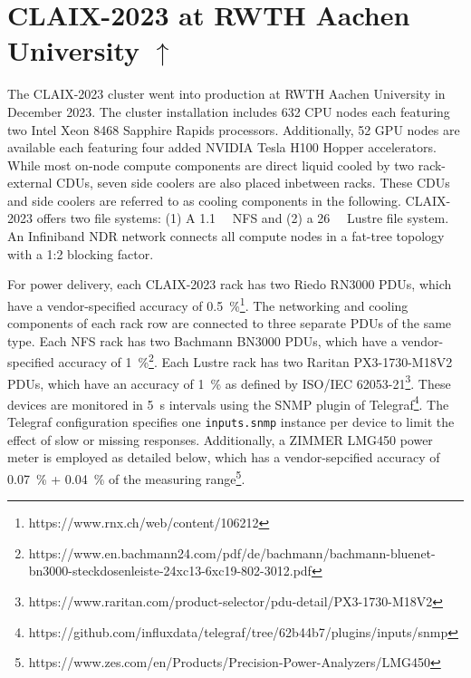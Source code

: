 \section[CLAIX-2023 at RWTH Aachen University]{CLAIX-2023 at RWTH Aachen University \hyperref[tab:examples-overview]{$\uparrow$}}
\label{sec:example-rwth-claix-2023}

The CLAIX-2023 cluster went into production at RWTH Aachen University in December 2023.
The cluster installation includes 632 CPU nodes each featuring two Intel Xeon 8468 Sapphire Rapids processors.
Additionally, 52 GPU nodes are available each featuring four added NVIDIA Tesla H100 Hopper accelerators.
While most on-node compute components are direct liquid cooled by two rack-external \acp{CDU}, seven side coolers are also placed inbetween racks.
These \acp{CDU} and side coolers are referred to as cooling components in the following.
CLAIX-2023 offers two file systems: (1) A \SI{1.1}{\peta\byte} NFS and (2) a \SI{26}{\peta\byte} Lustre file system.
An Infiniband NDR network connects all compute nodes in a fat-tree topology with a 1:2 blocking factor.

For power delivery, each CLAIX-2023 rack has two Riedo RN3000 \acp{PDU}, which have a vendor-specified accuracy of \SI{0.5}{\percent}\footnote{https://www.rnx.ch/web/content/106212}.
The networking and cooling components of each rack row are connected to three separate \acp{PDU} of the same type.
Each NFS rack has two Bachmann BN3000 \acp{PDU}, which have a vendor-specified accuracy of \SI{1}{\percent}\footnote{https://www.en.bachmann24.com/pdf/de/bachmann/bachmann-bluenet-bn3000-steckdosenleiste-24xc13-6xc19-802-3012.pdf}.
Each Lustre rack has two Raritan PX3-1730-M18V2 \acp{PDU}, which have an accuracy of \SI{1}{\percent} as defined by ISO/IEC 62053-21\footnote{https://www.raritan.com/product-selector/pdu-detail/PX3-1730-M18V2}.
These devices are monitored in \SI{5}{\second} intervals using the \ac{SNMP} plugin of Telegraf\footnote{https://github.com/influxdata/telegraf/tree/62b44b7/plugins/inputs/snmp}.
The Telegraf configuration specifies one \texttt{inputs.snmp} instance per device to limit the effect of slow or missing responses.
Additionally, a ZIMMER LMG450 power meter is employed as detailed below, which has a vendor-sepcified accuracy of \SI{0.07}{\percent} + \SI{0.04}{\percent} of the measuring range\footnote{https://www.zes.com/en/Products/Precision-Power-Analyzers/LMG450}.

